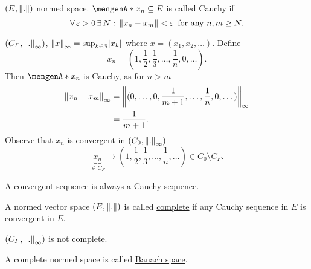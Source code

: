 \begin{definition*}
	$(E, \norm{.})$ normed space. $\set{x_n} \subseteq E$ is called Cauchy if
	\[
		\forall\, \varepsilon >0 \,\exists\,N: \,\norm{x_n-x_m}< \varepsilon \,\text{ for any }n,m \geq N.
	\]
\end{definition*}
\begin{beispiel}
	$(C_F,\norm{.}_{\infty})$, $\norm{x}_{\infty}= \sup_{k \in \mathbb{N}}\abs{x_k}$ where $x = (x_1,x_2,\dots)$. Define
	\[
		x_n = (1, \frac{1}{2}, \frac{1}{3}, \dots, \frac{1}{n}, 0, \dots).
	\]
	Then $\set{x_n}$ is Cauchy, as for $n >m$ 
	\begin{align*}
		\norm{x_n-x_m}_{\infty} &= \norm{(0, \dots,0, \frac{1}{m+1}, \dots, \frac{1}{n},0,\dots)}_{\infty} \\
		&= \frac{1}{m+1}.
	\end{align*}
	Observe that $x_n$ is convergent in $(C_0,\norm{.}_{\infty})$
	\[
		\underset{\in C_F}{\underbrace{x_n}} \to (1, \frac{1}{2}, \frac{1}{3}, \dots, \frac{1}{n}, \dots) \in C_0 \setminus C_F.
	\]
\end{beispiel}
\begin{satz}
	A convergent sequence is always a Cauchy sequence.
\end{satz}
\begin{definition*}
	A normed vector space $(E, \norm{.})$ is called \underline{complete} if any Cauchy sequence in $E$ is convergent in $E$.
\end{definition*}
$(C_F,\norm{.}_{\infty})$ is not complete.
\begin{definition*}
	A complete normed space is called \underline{Banach space}.
\end{definition*}
